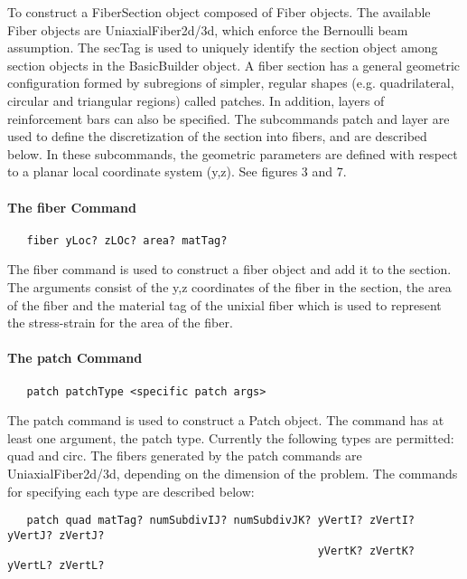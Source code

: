 \documentclass[12pt]{article}
\begin{document}
\noindent To construct a FiberSection object composed of Fiber objects.
The available Fiber objects are UniaxialFiber2d/3d, which enforce the
Bernoulli beam assumption. The secTag is used to uniquely identify the 
section object among section objects in the BasicBuilder object. A fiber 
section has a general geometric configuration formed by subregions
of simpler, regular shapes (e.g. quadrilateral, circular and triangular
regions) called patches. In addition, layers of reinforcement bars 
can also be specified. The subcommands patch and layer are used to
define the discretization of the section into
fibers, and are described below. In these subcommands, the geometric
parameters are defined with respect to a planar local coordinate system (y,z). 
See figures 3 and 7.

\paragraph{The fiber Command}

{\sf\small
\begin{verbatim}
   fiber yLoc? zLOc? area? matTag?
\end{verbatim}
}

The fiber command is used to construct a fiber object and add it to
the section. The arguments consist of the y,z coordinates of the fiber
in the section, the area of the fiber and the material tag of the
unixial fiber which is used to represent the stress-strain for the
area of the fiber.

\paragraph{The patch Command}

{\sf\small
\begin{verbatim}
   patch patchType <specific patch args>
\end{verbatim}
}

The patch command is used to construct a Patch object. 
The command has at least one argument, the patch type. Currently 
the following types are permitted: quad and circ. The fibers
generated by the patch commands are UniaxialFiber2d/3d, depending on
the dimension of the problem. The commands
for specifying each type are described below:

{\sf\small
\begin{verbatim}
   patch quad matTag? numSubdivIJ? numSubdivJK? yVertI? zVertI? yVertJ? zVertJ? 
                                                yVertK? zVertK? yVertL? zVertL?

\end{verbatim}
}
\end{document}
